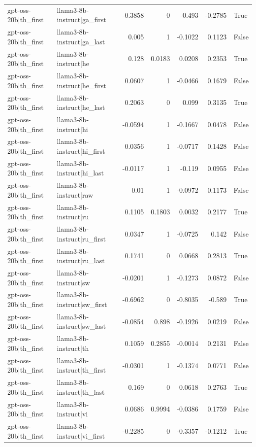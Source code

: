 \begin{table}
\begin{tabular}{l l r r r r l}
gpt-oss-20b|th_first & llama3-8b-instruct|ga_first & -0.3858 & 0 & -0.493 & -0.2785 & True \\
gpt-oss-20b|th_first & llama3-8b-instruct|ga_last & 0.005 & 1 & -0.1022 & 0.1123 & False \\
gpt-oss-20b|th_first & llama3-8b-instruct|he & 0.128 & 0.0183 & 0.0208 & 0.2353 & True \\
gpt-oss-20b|th_first & llama3-8b-instruct|he_first & 0.0607 & 1 & -0.0466 & 0.1679 & False \\
gpt-oss-20b|th_first & llama3-8b-instruct|he_last & 0.2063 & 0 & 0.099 & 0.3135 & True \\
gpt-oss-20b|th_first & llama3-8b-instruct|hi & -0.0594 & 1 & -0.1667 & 0.0478 & False \\
gpt-oss-20b|th_first & llama3-8b-instruct|hi_first & 0.0356 & 1 & -0.0717 & 0.1428 & False \\
gpt-oss-20b|th_first & llama3-8b-instruct|hi_last & -0.0117 & 1 & -0.119 & 0.0955 & False \\
gpt-oss-20b|th_first & llama3-8b-instruct|raw & 0.01 & 1 & -0.0972 & 0.1173 & False \\
gpt-oss-20b|th_first & llama3-8b-instruct|ru & 0.1105 & 0.1803 & 0.0032 & 0.2177 & True \\
gpt-oss-20b|th_first & llama3-8b-instruct|ru_first & 0.0347 & 1 & -0.0725 & 0.142 & False \\
gpt-oss-20b|th_first & llama3-8b-instruct|ru_last & 0.1741 & 0 & 0.0668 & 0.2813 & True \\
gpt-oss-20b|th_first & llama3-8b-instruct|sw & -0.0201 & 1 & -0.1273 & 0.0872 & False \\
gpt-oss-20b|th_first & llama3-8b-instruct|sw_first & -0.6962 & 0 & -0.8035 & -0.589 & True \\
gpt-oss-20b|th_first & llama3-8b-instruct|sw_last & -0.0854 & 0.898 & -0.1926 & 0.0219 & False \\
gpt-oss-20b|th_first & llama3-8b-instruct|th & 0.1059 & 0.2855 & -0.0014 & 0.2131 & False \\
gpt-oss-20b|th_first & llama3-8b-instruct|th_first & -0.0301 & 1 & -0.1374 & 0.0771 & False \\
gpt-oss-20b|th_first & llama3-8b-instruct|th_last & 0.169 & 0 & 0.0618 & 0.2763 & True \\
gpt-oss-20b|th_first & llama3-8b-instruct|vi & 0.0686 & 0.9994 & -0.0386 & 0.1759 & False \\
gpt-oss-20b|th_first & llama3-8b-instruct|vi_first & -0.2285 & 0 & -0.3357 & -0.1212 & True \\

\end{tabular}
\end{table}

